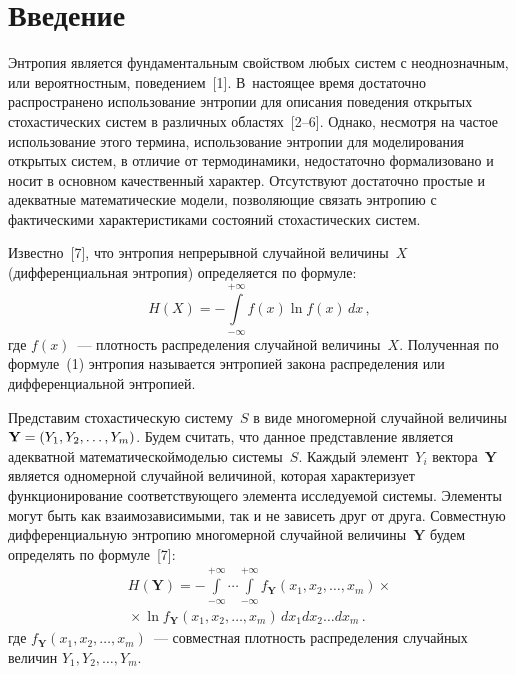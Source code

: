 

      \thispagestyle{headings}

      \begin{multicols}{2}

            \label{st\stat}
  
  \section{Введение}
  
  Энтропия является фундаментальным свойством любых систем с 
неоднозначным, или вероятностным, поведением~[1]. В~настоящее время 
достаточно распространено использование энтропии для описания поведения 
открытых стохастических систем в различных областях~[2--6]. Однако, 
несмотря на частое использование этого термина, использование энтропии для 
моделирования открытых систем, в отличие от термодинамики, недостаточно 
формализовано и носит в основном качественный характер. Отсутствуют 
достаточно простые и адекватные математические модели, позволяющие 
связать энтропию с фактическими характеристиками состояний стохастических 
систем.
  
  Известно~[7], что энтропия непрерывной случайной величины~$X$ 
(дифференциальная энтропия) определяется по формуле:
  \begin{equation}
  H(X) =-\int\limits_{-\infty}^{+\infty} f(x)\ln f(x)\,dx\,,
  \label{e1-t}
  \end{equation}
  где $f(x)$~--- плотность распределения случайной величины~$X$. 
Полученная по формуле~(1) энтропия называется энтропией закона 
распределения или дифференциальной энтропией.
  
  Представим стохастическую систему~$S$ в виде многомерной случайной 
величины $\mathbf{Y}\hm=(Y_1, Y_2,\ldots , Y_m)$. Будем считать, что данное 
представление является адекватной математической\linebreak моделью системы~$S$. 
Каждый элемент~$Y_i$ вектора~\textbf{Y} является одномерной случайной 
величиной, которая характеризует функционирование соответствующего 
элемента исследуемой системы. Элементы могут быть как взаимозависимыми, 
так и не зависеть друг от друга. Совместную дифференциальную энтропию 
многомерной случайной величины~$\mathbf{Y}$ будем определять по 
формуле~[7]:
  \begin{multline}
  H(\mathbf{Y})=-\int\limits_{-\infty}^{+\infty} \cdots \int\limits_{-
\infty}^{+\infty} f_{\mathbf{Y}}(x_1,x_2,\ldots ,x_m)\times{}\\
{}\times \ln  f_{\mathbf{Y}}(x_1,x_2,\ldots ,x_m)\,dx_1dx_2\ldots dx_m\,.
  \label{e2-t}
  \end{multline}
  где $ f_{\mathbf{Y}}(x_1,x_2,\ldots ,x_m)$~--- совместная плотность 
распределения случайных величин $Y_1, Y_2, \ldots , Y_m$.
  

\end{multicols}
